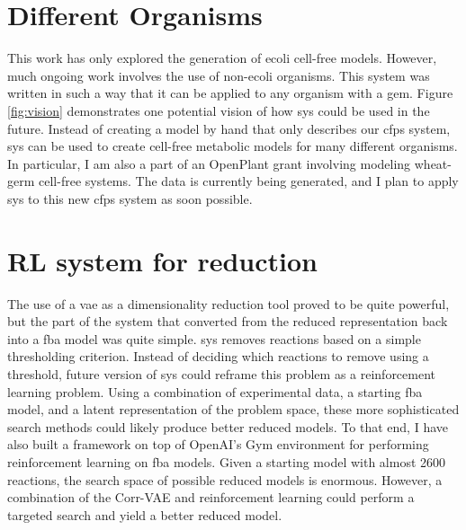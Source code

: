\section{Different Organisms}
This work has only explored the generation of \gls{ecoli} cell-free models.
However, much ongoing work involves the use of non-\gls{ecoli} organisms.
This system was written in such a way that it can be applied to any organism with a \gls{gem}.
Figure \ref{fig:vision} demonstrates one potential vision of how \gls{sys} could be used in the future.
Instead of creating a model by hand that only describes our \gls{cfps} system, \gls{sys} can be used to create cell-free metabolic models for many different organisms.
In particular, I am also a part of an OpenPlant grant involving modeling wheat-germ cell-free systems.
The data is currently being generated, and I plan to apply \gls{sys} to this new \gls{cfps} system as soon possible.

\section{RL system for reduction}
The use of a \gls{vae} as a dimensionality reduction tool proved to be quite powerful, but the part of the system that converted from the reduced representation back into a \gls{fba} model was quite simple.
\gls{sys} removes reactions based on a simple thresholding criterion.
Instead of deciding which reactions to remove using a threshold, future version of \gls{sys} could reframe this problem as a reinforcement learning problem.
Using a combination of experimental data, a starting \gls{fba} model, and a latent representation of the problem space, these more sophisticated search methods could likely produce better reduced models.
To that end, I have also built a framework on top of OpenAI's Gym environment for performing reinforcement learning on \gls{fba} models.
Given a starting model with almost 2600 reactions, the search space of possible reduced models is enormous.
However, a combination of the Corr-VAE and reinforcement learning could perform a targeted search and yield a better reduced model.

